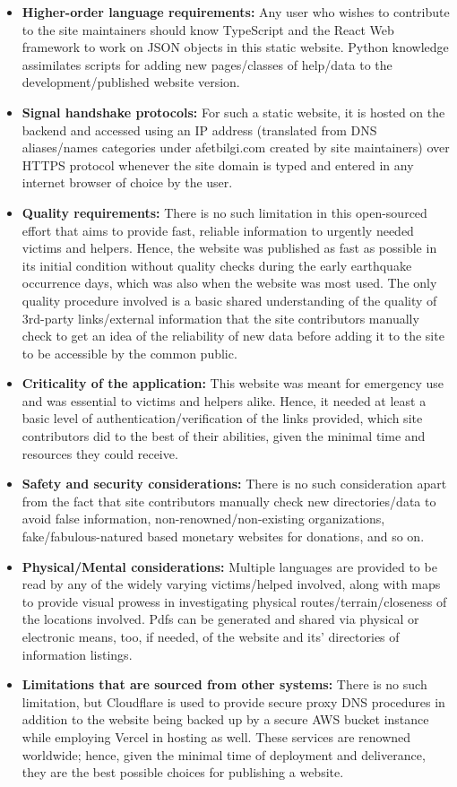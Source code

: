 \begin{itemize}
  \item \textbf{Higher-order language requirements:} Any user who wishes to contribute to the site maintainers should know TypeScript and the React Web framework to work on JSON objects in this static website. Python knowledge assimilates scripts for adding new pages/classes of help/data to the development/published website version.
  \item \textbf{Signal handshake protocols:} For such a static website, it is hosted on the backend and accessed using an IP address (translated from DNS aliases/names categories under afetbilgi.com created by site maintainers) over HTTPS protocol whenever the site domain is typed and entered in any internet browser of choice by the user.
  \item \textbf{Quality requirements:} There is no such limitation in this open-sourced effort that aims to provide fast, reliable information to urgently needed victims and helpers. Hence, the website was published as fast as possible in its initial condition without quality checks during the early earthquake occurrence days, which was also when the website was most used. The only quality procedure involved is a basic shared understanding of the quality of 3rd-party links/external information that the site contributors manually check to get an idea of the reliability of new data before adding it to the site to be accessible by the common public.
  \item \textbf{Criticality of the application:} This website was meant for emergency use and was essential to victims and helpers alike. Hence, it needed at least a basic level of authentication/verification of the links provided, which site contributors did to the best of their abilities, given the minimal time and resources they could receive.
  \item \textbf{Safety and security considerations:} There is no such consideration apart from the fact that site contributors manually check new directories/data to avoid false information, non-renowned/non-existing organizations, fake/fabulous-natured based monetary websites for donations, and so on.
  
  \vspace*{\fill}
  \newpage

  \item \textbf{Physical/Mental considerations:} Multiple languages are provided to be read by any of the widely varying victims/helped involved, along with maps to provide visual prowess in investigating physical routes/terrain/closeness of the locations involved. Pdfs can be generated and shared via physical or electronic means, too, if needed, of the website and its' directories of information listings.
  \item \textbf{Limitations that are sourced from other systems:} There is no such limitation, but Cloudflare is used to provide secure proxy DNS procedures in addition to the website being backed up by a secure AWS bucket instance while employing Vercel in hosting as well. These services are renowned worldwide; hence, given the minimal time of deployment and deliverance, they are the best possible choices for publishing a website.
\end{itemize}

